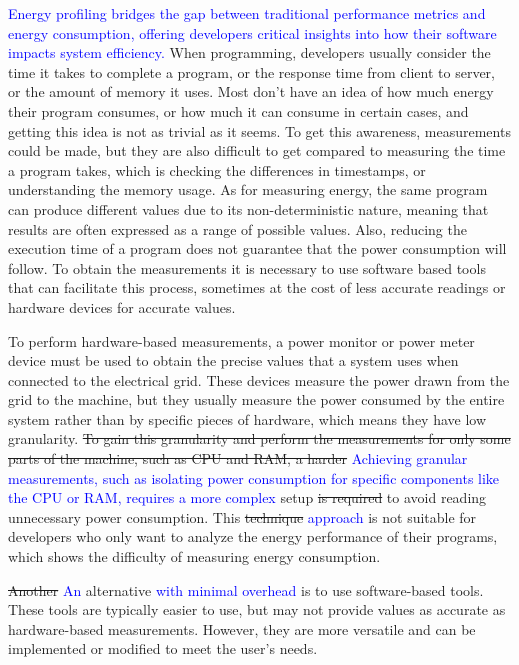 \documentclass[sigplan]{acmart}
\newcommand{\wnote}[1]{\textcolor{blue}{#1}}
\begin{document}
\wnote{Energy profiling bridges the gap between traditional performance metrics and energy consumption, offering developers critical insights into how their software impacts system efficiency.} 
When programming, developers usually consider the time it takes to complete a program, or the response time from client to server, or the amount of memory it uses. Most don't have an idea of how much energy their program consumes, or how much it can consume in certain cases, and getting this idea is not as trivial as it seems. To get this awareness, measurements could be made, but they are also difficult to get compared to measuring the time a program takes, which is checking the differences in timestamps, or understanding the memory usage. As for measuring energy, the same program can produce different values due to its non-deterministic nature, meaning that results are often expressed as a range of possible values. Also, reducing the execution time of a program does not guarantee that the power consumption will follow\cite{10.1145/3136014.3136031}. To obtain the measurements it is necessary to use software based tools that can facilitate this process, sometimes at the cost of less accurate readings or hardware devices for accurate values.

To perform hardware-based measurements, a power monitor or power meter device\cite{hackenberg2013power,ge2009powerpack} must be used to obtain the precise values that a system uses when connected to the electrical grid. These devices measure the power drawn from the grid to the machine, but they usually measure the power consumed by the entire system rather than by specific pieces of hardware, which means they have low granularity. \st{To gain this granularity and perform the measurements for only some parts of the machine, such as CPU and RAM, a harder} \wnote{Achieving granular measurements, such as isolating power consumption for specific components like the CPU or RAM, requires a more complex } setup \st{is required} to avoid reading unnecessary power consumption. This \st{technique} \wnote{approach} is not suitable for developers who only want to analyze the energy performance of their programs, which shows the difficulty of measuring energy consumption.

\st{Another} \wnote{An} alternative \wnote{with minimal overhead} is to use software-based tools. These tools are typically easier to use, but may not provide values as accurate as hardware-based measurements. However, they are more versatile and can be implemented or modified to meet the user's needs. 
\end{document}
